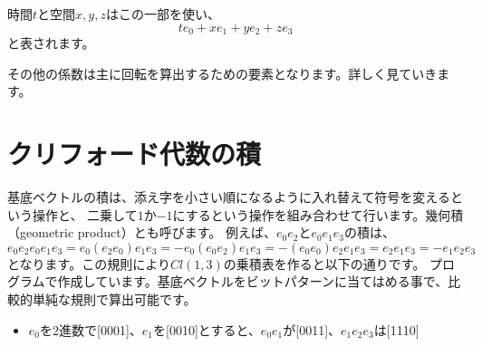 \documentclass[a4paper,12pt,notitlepage]{jsreport}
\begin{document}
時間$t$と空間$x,y,z$はこの一部を使い、
\begin{equation}
  te_0+xe_1+ye_2+ze_3
\end{equation}
と表されます。

その他の係数は主に回転を算出するための要素となります。詳しく見ていきます。

\section{クリフォード代数の積}

基底ベクトルの積は、添え字を小さい順になるように入れ替えて符号を変えるという操作と、
二乗して$1$か$-1$にするという操作を組み合わせて行います。幾何積（geometric product）とも呼びます。
例えば、$e_0e_2$と$e_0e_1e_3$の積は、
\begin{equation}
  e_0e_2e_0e_1e_3=e_0(e_2e_0)e_1e_3=-e_0(e_0e_2)e_1e_3=-(e_0e_0)e_2e_1e_3=e_2e_1e_3=-e_1e_2e_3
\end{equation}
となります。この規則により$Cl(1,3)$の乗積表を作ると以下の通りです。
プログラムで作成しています。基底ベクトルをビットパターンに当てはめる事で、比較的単純な規則で算出可能です。
\begin{itemize}
  \item $e_0$を2進数で[0001]、$e_1$を[0010]とすると、$e_0e_1$が[0011]、$e_1e_2e_3$は[1110]
\end{itemize}
\end{document}
